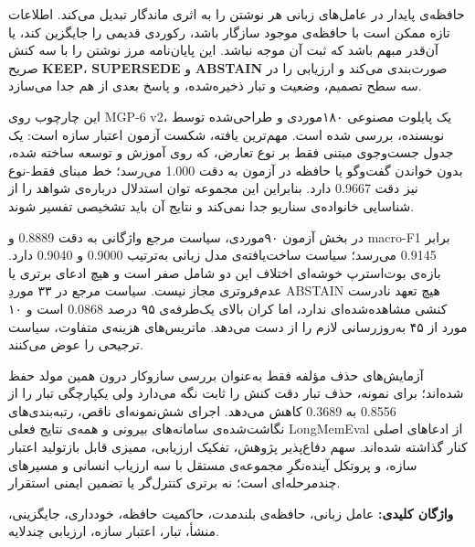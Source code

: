 حافظه‌ی پایدار در عامل‌های زبانی هر نوشتن را به اثری ماندگار تبدیل می‌کند.
اطلاعات تازه ممکن است با حافظه‌ی موجود سازگار باشد، رکوردی قدیمی را
جایگزین کند، یا آن‌قدر مبهم باشد که ثبت آن موجه نباشد. این پایان‌نامه مرز
نوشتن را با سه کنش صریح \textbf{KEEP}، \textbf{SUPERSEDE} و
\textbf{ABSTAIN} صورت‌بندی می‌کند و ارزیابی را در سه سطح تصمیم، وضعیت و
تبار ذخیره‌شده، و پاسخ بعدی از هم جدا می‌سازد.

این چارچوب روی MGP-6 v2، یک پایلوت مصنوعی ۱۸۰‌موردی و طراحی‌شده توسط
نویسنده، بررسی شده است. مهم‌ترین یافته، شکست آزمون اعتبار سازه است: یک
جدول جست‌وجوی مبتنی فقط بر نوع تعارض، که روی آموزش و توسعه ساخته شده،
بدون خواندن گفت‌وگو یا حافظه در آزمون به دقت 1.000 می‌رسد؛ خط مبنای
فقط-نوع نیز دقت 0.9667 دارد. بنابراین این مجموعه توان استدلال درباره‌ی
شواهد را از شناسایی خانواده‌ی سناریو جدا نمی‌کند و نتایج آن باید تشخیصی
تفسیر شوند.

در بخش آزمون ۹۰‌موردی، سیاست مرجع واژگانی به دقت 0.8889 و macro-F1 برابر
0.9145 می‌رسد؛ سیاست ساخت‌یافته‌ی مدل زبانی به‌ترتیب 0.9000 و 0.9040 دارد.
بازه‌ی بوت‌استرپ خوشه‌ای اختلاف این دو شامل صفر است و هیچ ادعای برتری یا
عدم‌فروتری مجاز نیست. سیاست مرجع در ۳۳ موردِ ABSTAIN هیچ تعهد نادرست کنشی
مشاهده‌شده‌ای ندارد، اما کران بالای یک‌طرفه‌ی ۹۵ درصد 0.0868 است و ۱۰ مورد
از ۴۵ به‌روزرسانی لازم را از دست می‌دهد. ماتریس‌های هزینه‌ی متفاوت، سیاست
ترجیحی را عوض می‌کنند.

آزمایش‌های حذف مؤلفه فقط به‌عنوان بررسی سازوکار درون همین مولد حفظ شده‌اند؛
برای نمونه، حذف تبار دقت کنش را ثابت نگه می‌دارد ولی یکپارچگی تبار را از
0.8556 به 0.3689 کاهش می‌دهد. اجرای شش‌نمونه‌ای ناقص، رتبه‌بندی‌های نگاشت‌شده‌ی
سامانه‌های بیرونی و همه‌ی نتایج فعلی LongMemEval از ادعاهای اصلی کنار
گذاشته شده‌اند. سهم دفاع‌پذیر پژوهش، تفکیک ارزیابی، ممیزی قابل بازتولید
اعتبار سازه، و پروتکل آینده‌نگرِ مجموعه‌ی مستقل با سه ارزیاب انسانی و
مسیرهای چندمرحله‌ای است؛ نه برتری کنترل‌گر یا تضمین ایمنی استقرار.

\textbf{واژگان کلیدی:} عامل زبانی، حافظه‌ی بلندمدت، حاکمیت حافظه،
خودداری، جایگزینی، منشأ، تبار، اعتبار سازه، ارزیابی چندلایه.

